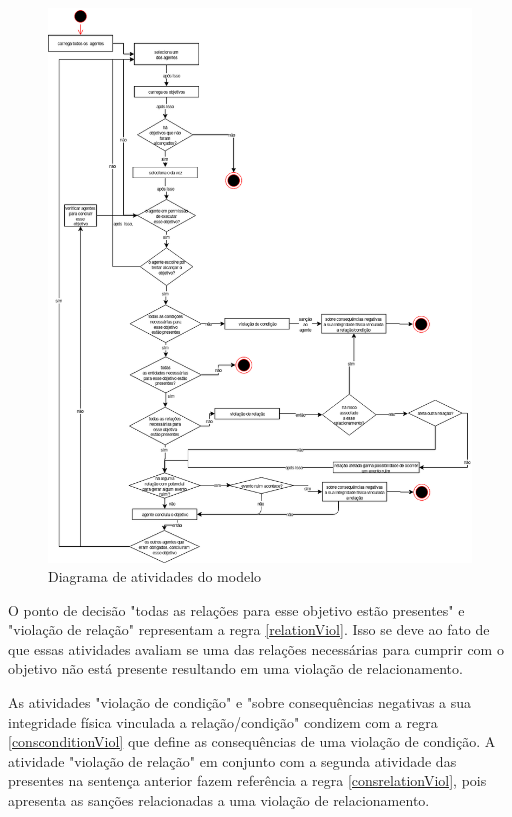 \begin{figure}[H]
  \centering
  \includegraphics[width=1\linewidth]{figure/DiagramaDeAtividade.png} 
  \caption{Diagrama de atividades do modelo}
  \label{atividiagram}
\end{figure}

O ponto de decisão "todas as relações para esse objetivo estão presentes" e "violação de relação" representam a regra \ref{relationViol}. Isso se deve ao fato de que essas atividades avaliam se uma das relações necessárias para cumprir com o objetivo não está presente resultando em uma violação de relacionamento. 

As atividades  "violação de condição" e "sobre consequências negativas a sua integridade física vinculada a relação/condição" condizem com a regra \ref{consconditionViol} que define as consequências de uma violação de condição. A atividade "violação de relação" em conjunto com a segunda atividade das presentes na sentença anterior fazem referência a regra \ref{consrelationViol}, pois apresenta as sanções relacionadas a uma violação de relacionamento. 

